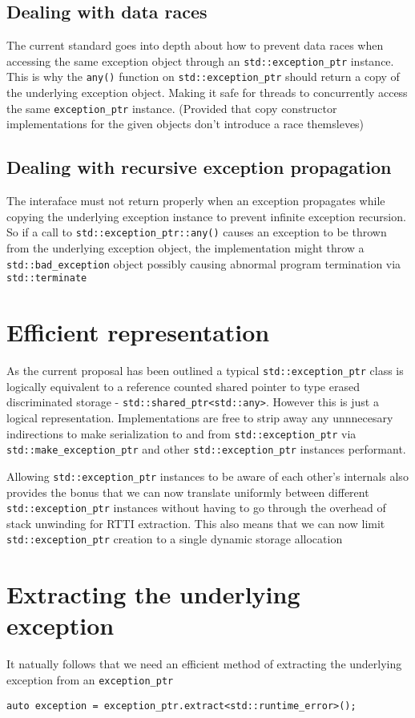 \documentclass{article}
\begin{document}
\subsection{Dealing with data races}
The current standard goes into depth about how to prevent data races when
accessing the same exception object through an \texttt{std::exception\_ptr}
instance.  This is why the \texttt{any()} function on
\texttt{std::exception\_ptr} should return a copy of the underlying exception
object.  Making it safe for threads to concurrently access the same
\texttt{exception\_ptr} instance.  (Provided that copy constructor
implementations for the given objects don't introduce a race themsleves)

\subsection{Dealing with recursive exception propagation}
The interaface must not return properly when an exception propagates while
copying the underlying exception instance to prevent infinite exception
recursion.  So if a call to \texttt{std::exception\_ptr::any()} causes an
exception to be thrown from the underlying exception object, the
implementation might throw a \texttt{std::bad\_exception} object possibly
causing abnormal program termination via \texttt{std::terminate}

\section{Efficient representation}
As the current proposal has been outlined a typical \texttt{std::exception\_ptr}
class is logically equivalent to a reference counted shared pointer to type
erased discriminated storage - \texttt{std::shared\_ptr<std::any>}.  However
this is just a logical representation.  Implementations are free to strip away
any unnnecesary indirections to make serialization to and from
\texttt{std::exception\_ptr} via \texttt{std::make\_exception\_ptr} and other
\texttt{std::exception\_ptr} instances performant.

Allowing \texttt{std::exception\_ptr} instances to be aware of each other's
internals also provides the bonus that we can now translate uniformly between
different \texttt{std::exception\_ptr} instances without having to go through
the overhead of stack unwinding for RTTI extraction.  This also means that we
can now limit \texttt{std::exception\_ptr} creation to a single dynamic
storage allocation

\section{Extracting the underlying exception}
It natually follows that we need an efficient method of extracting the
underlying exception from an \texttt{exception\_ptr}
\begin{lstlisting}
auto exception = exception_ptr.extract<std::runtime_error>();
\end{lstlisting}
\end{document}
